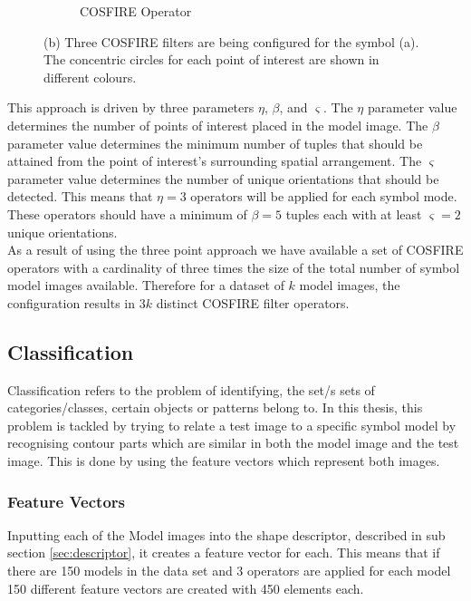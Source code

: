 \begin{figure}[h]
\begin{subfigure}[b]{0.4\textwidth}
                \caption{COSFIRE Operator}
                \label{fig:cosfireoperator}
        \end{subfigure}
        \caption[An example of a 3-point approach in configuring COSFIRE filters.]{(b) Three COSFIRE filters are being configured for the symbol (a). The concentric circles for each point of interest are shown in different colours.}
        \label{fig:3PointCOSFIREoperatorExample}
\end{figure}
\vspace{100mm}
This approach is driven by three parameters $\eta$, $\beta$, and $\varsigma$. The $\eta$ parameter value determines the number of points of interest placed in the model image. The $\beta$ parameter value determines the minimum number of tuples that should be attained from the point of interest's surrounding spatial arrangement. The $\varsigma$ parameter value determines the number of unique orientations that should be detected. This means that $\eta=3$ operators will be applied for each symbol mode. These operators should have a minimum of $\beta = 5$ tuples each with at least $\varsigma = 2$ unique orientations. \\

As a result of using the three point approach we have available a set of COSFIRE operators with a cardinality of three times the size of the total number of symbol model images available. Therefore for a dataset of $k$ model images, the configuration results in $3k$ distinct COSFIRE filter operators.

\subsection{Classification}
\label{sec:classify}
Classification refers to the problem of identifying, the set/s sets of categories/classes, certain objects or patterns belong to. In this thesis, this problem is tackled by trying to relate a test image to a specific symbol model by recognising contour parts which are similar in both the model image and the test image. This is done by using the feature vectors which represent both images.

\subsubsection{Feature Vectors}
Inputting each of the Model images into the shape descriptor, described in sub section \ref{sec:descriptor}, it creates a feature vector for each. This means that if there are 150 models in the data set and 3 operators are applied for each model 150 different feature vectors are created with 450 elements each. 

